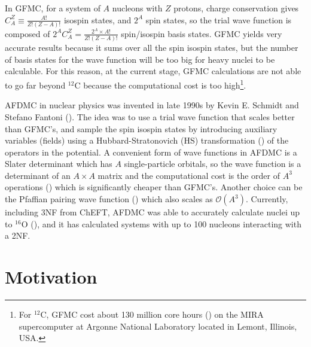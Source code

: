\documentclass[12pt,letterpaper,UTF8]{report}
\begin{document}
In GFMC, for a system of $A$ nucleons with $Z$ protons, charge conservation gives $C_A^Z \equiv  \frac{A!}{Z!(Z-A)!}$ isospin states, and $2^A$ spin states, so the trial wave function is composed of $2^A C_A^Z =\frac{2^A \times A!}{Z!(Z-A)!}$ spin/isospin basis states. GFMC yields very accurate results because it sums over all the spin isospin states, but the number of basis states for the wave function will be too big for heavy nuclei to be calculable. For this reason, at the current stage, GFMC calculations are not able to go far beyond $^{12}$C because the computational cost is too high\footnote{For $^{12}$C, GFMC cost about 130 million core hours (\cite{lovato2020ab}) on the MIRA supercomputer at Argonne National Laboratory located in Lemont, Illinois, USA.}.

AFDMC in nuclear physics was invented in late 1990s by Kevin E. Schmidt and Stefano Fantoni (\cite{Schmidt99a}). The idea was to  use a trial wave function that scales better than GFMC's, and sample the spin isospin states by introducing auxiliary variables (fields) using a Hubbard-Stratonovich (HS) transformation (\cite{CarlsonRMP15a}) of the operators in the potential.
 A convenient form of wave functions in AFDMC is a Slater determinant which has $A$ single-particle orbitals, so the wave function is a determinant of an $A \times A$ matrix and the computational cost is the order of $A^3$ operations (\cite{wikiCompcost}) which is significantly cheaper than GFMC's.
 Another choice can be the Pfaffian pairing wave function (\cite{Bajdich2006PRL}) which also scales as $\mathcal{O}(A^3)$.
Currently, including 3NF from ChEFT, AFDMC was able to accurately calculate nuclei up to $^{16}\textrm{O}$ (\cite{Lonardoni2018PRL}), and it has calculated systems with up to 100 nucleons interacting with a 2NF.


\section{Motivation}
\end{document}
